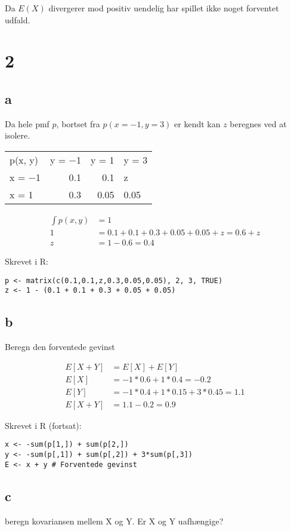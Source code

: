 \documentclass[11pt]{article}
\begin{document}
Da \(E(X)\) divergerer mod positiv uendelig har spillet ikke noget forventet udfald.
\section{2}
\label{sec:org4596370}
\subsection{a}
\label{sec:org97ade03}
Da hele pmf \(p\), bortset fra \(p(x=-1,y=3)\) er kendt kan \(z\) beregnes ved at isolere.

\begin{center}
\begin{tabular}{lrrl}
p(x, y) & y = −1 & y = 1 & y = 3\\
x = −1 & 0.1 & 0.1 & z\\
x = 1 & 0.3 & 0.05 & 0.05\\
\end{tabular}
\end{center}

\begin{align}
\int p(x,y) &= 1 \\
1 &= 0.1 + 0.1 + 0.3 + 0.05 + 0.05 + z = 0.6 + z \\
z &= 1 - 0.6 = 0.4
\end{align}

Skrevet i R:
\begin{verbatim}
p <- matrix(c(0.1,0.1,z,0.3,0.05,0.05), 2, 3, TRUE)
z <- 1 - (0.1 + 0.1 + 0.3 + 0.05 + 0.05)
\end{verbatim}
\subsection{b}
\label{sec:org36a9c81}
Beregn den forventede gevinst

\begin{align}
E[X+Y] &= E[X] + E[Y] \\
E[X] &= -1*0.6 + 1*0.4 = -0.2 \\
E[Y] &= -1*0.4 + 1*0.15 + 3*0.45 = 1.1 \\
E[X+Y] &= 1.1 - 0.2 = 0.9
\end{align}

Skrevet i R (fortsat):

\begin{verbatim}
x <- -sum(p[1,]) + sum(p[2,])
y <- -sum(p[,1]) + sum(p[,2]) + 3*sum(p[,3])
E <- x + y # Forventede gevinst
\end{verbatim}
\subsection{c}
\label{sec:orge7be5fe}
beregn kovariansen mellem X og Y. Er X og Y uafhængige?
\end{document}
